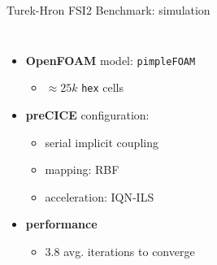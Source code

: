 \documentclass[10pt,t]{beamer}
\begin{document}
\begin{frame}{Turek-Hron FSI2 Benchmark: simulation}
\begin{columns}
\begin{itemize}
    \item \textbf{OpenFOAM} model: \texttt{pimpleFOAM}
    \begin{itemize}
        \item $\approx 25k$ \texttt{hex} cells
    \end{itemize}
    \item \textbf{preCICE} configuration:
    \begin{itemize}
        \item serial implicit coupling
        \item mapping: RBF
        \item acceleration: IQN-ILS
    \end{itemize}
    \item \textbf{performance}
    \begin{itemize}
        \item 3.8 avg. iterations to converge
    \end{itemize}
\end{itemize}

\end{columns}

\end{frame}
\end{document}
